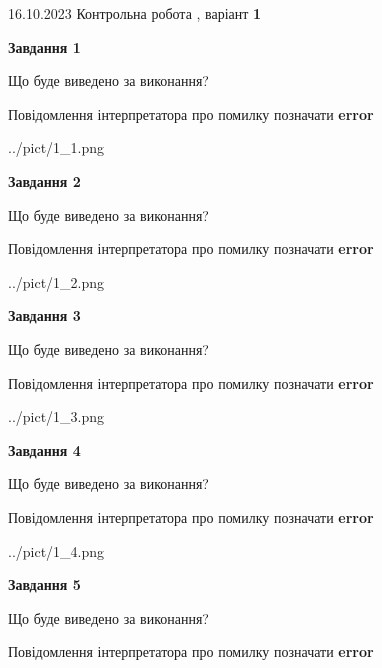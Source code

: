 \documentclass[12pt, ukrainian]{article}
\begin{document}
{\Large{16.10.2023 Контрольна робота , варіант  \No \textbf { 1 }\par}}
{
\begin {large}
{\begin {center}\textbf{Завдання 1}\end {center}}\par
Що буде виведено за виконання? \par
Повідомлення інтерпретатора про помилку позначати \textbf{error}

\begin{center}
	{../pict/1_1.png}
\end{center}
\newpage

{\begin {center}\textbf{Завдання 2}\end {center}}\par
Що буде виведено за виконання? \par
Повідомлення інтерпретатора про помилку позначати \textbf{error}

\begin{center}
	{../pict/1_2.png}
\end{center}
\newpage

{\begin {center}\textbf{Завдання 3}\end {center}}\par
Що буде виведено за виконання? \par
Повідомлення інтерпретатора про помилку позначати \textbf{error}

\begin{center}
	{../pict/1_3.png}
\end{center}
\newpage

{\begin {center}\textbf{Завдання 4}\end {center}}\par
Що буде виведено за виконання? \par
Повідомлення інтерпретатора про помилку позначати \textbf{error}

\begin{center}
	{../pict/1_4.png}
\end{center}
\newpage

{\begin {center}\textbf{Завдання 5}\end {center}}\par
Що буде виведено за виконання? \par
Повідомлення інтерпретатора про помилку позначати \textbf{error}


\end{large}}
\end{document}
